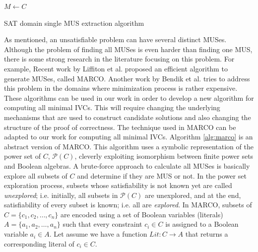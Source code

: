 \begin{algorithm}[t]
  \BlankLine
  $M \leftarrow C$\\
   {
  }
\caption{SAT domain single MUS extraction algorithm}
\label{alg:mus}
\end{algorithm}

As mentioned, an unsatisfiable problem can have several distinct MUSes. Although the problem of finding all MUSes is even harder than finding one MUS, there is some strong research in the literature focusing on this problem. For example, Recent work by Liffiton et al. \cite{marco2016fast} proposed an efficient algorithm to generate MUSes, called MARCO.
Another work by Bendik et al. \cite{bendk16} tries to address this problem in the domains where minimization process is rather expensive.
These algorithms can be used in our work in order to develop a new algorithm for computing all minimal IVCs. This will require changing the underlying mechanisms that are used to construct candidate solutions and also changing the structure of the proof of correctness. The technique used in MARCO can be adapted to our work for computing all minimal IVCs. Algorithm \ref{alg:marco} is an abstract version of MARCO. This algorithm uses a symbolic representation of the
power set of $C$, $\mathcal{P} (C)$,  cleverly exploiting isomorphism between finite power sets
and Boolean algebras.
A brute-force approach to calculate all MUSes is basically explore all subsets of $C$ and determine if they are MUS or not. In the power set exploration process, subsets whose satisfiability is not known
yet are called \emph{unexplored}; i.e. initially, all subsets in $\mathcal{P} (C)$ are unexplored, and at the end, satisfiability of every subset is known; i.e. all are \emph{explored}.
In MARCO, subsets of
 $C = \{c_1 ,c_2 , \dots ,c_n \}$ are encoded using a set of Boolean variables (literals)
$A = \{a_1 ,a_2 , \dots, a_n \}$ such that every constraint $c_i \in C$ is assigned to a Boolean variable $a_i \in A$. Let assume we have a function $Lit: C \rightarrow A$ that returns a corresponding literal of $c_i \in C$.

